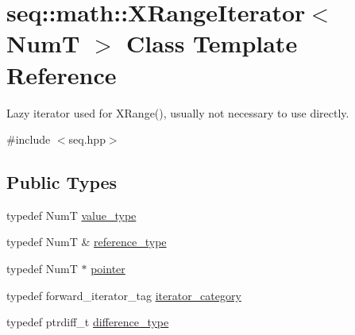 \hypertarget{classseq_1_1math_1_1_x_range_iterator}{\section{seq\-:\-:math\-:\-:X\-Range\-Iterator$<$ Num\-T $>$ Class Template Reference}
\label{classseq_1_1math_1_1_x_range_iterator}
}


Lazy iterator used for X\-Range(), usually not necessary to use directly.  




{\ttfamily \#include $<$seq.\-hpp$>$}

\subsection*{Public Types}
\begin{DoxyCompactItemize}
\item 
typedef Num\-T \hyperlink{classseq_1_1math_1_1_x_range_iterator_a18b93b3a4ea6128dedb3668b35814bf0}{value\-\_\-type}
\item 
typedef Num\-T \& \hyperlink{classseq_1_1math_1_1_x_range_iterator_a0bb59d21d7807cd3c0f354d4657ce543}{reference\-\_\-type}
\item 
typedef Num\-T $\ast$ \hyperlink{classseq_1_1math_1_1_x_range_iterator_a594e9803c20ec88fc489fc70e61b13a2}{pointer}
\item 
typedef forward\-\_\-iterator\-\_\-tag \hyperlink{classseq_1_1math_1_1_x_range_iterator_afa575aa34d0b2740ccfbd9ca512309a0}{iterator\-\_\-category}
\item 
typedef ptrdiff\-\_\-t \hyperlink{classseq_1_1math_1_1_x_range_iterator_aff997a44dcd04a95ae2e0255d9cdaf43}{difference\-\_\-type}
\end{DoxyCompactItemize}
